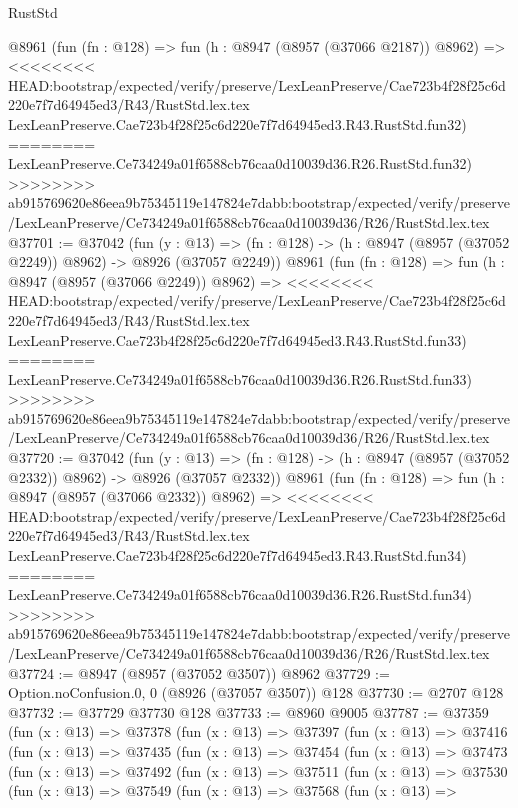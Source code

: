 \begin{lexlean}{RustStd}
\begin{coremodule}
{\begin{coremodule}
{{{{{{{{{{{{{{{{{{{{{{{{{{{{{{{{{{{{{{{    @8961
    (fun (fn : @128) =>
    fun (h : @8947 (@8957 (@37066 @2187)) @8962) =>
<<<<<<<< HEAD:bootstrap/expected/verify/preserve/LexLeanPreserve/Cae723b4f28f25c6d220e7f7d64945ed3/R43/RustStd.lex.tex
    LexLeanPreserve.Cae723b4f28f25c6d220e7f7d64945ed3.R43.RustStd.fun32)
========
    LexLeanPreserve.Ce734249a01f6588cb76caa0d10039d36.R26.RustStd.fun32)
>>>>>>>> ab915769620e86eea9b75345119e147824e7dabb:bootstrap/expected/verify/preserve/LexLeanPreserve/Ce734249a01f6588cb76caa0d10039d36/R26/RustStd.lex.tex
@37701 := @37042
    (fun (y : @13) =>
    (fn : @128) -> (h : @8947 (@8957 (@37052 @2249)) @8962) -> @8926 (@37057 @2249))
    @8961
    (fun (fn : @128) =>
    fun (h : @8947 (@8957 (@37066 @2249)) @8962) =>
<<<<<<<< HEAD:bootstrap/expected/verify/preserve/LexLeanPreserve/Cae723b4f28f25c6d220e7f7d64945ed3/R43/RustStd.lex.tex
    LexLeanPreserve.Cae723b4f28f25c6d220e7f7d64945ed3.R43.RustStd.fun33)
========
    LexLeanPreserve.Ce734249a01f6588cb76caa0d10039d36.R26.RustStd.fun33)
>>>>>>>> ab915769620e86eea9b75345119e147824e7dabb:bootstrap/expected/verify/preserve/LexLeanPreserve/Ce734249a01f6588cb76caa0d10039d36/R26/RustStd.lex.tex
@37720 := @37042
    (fun (y : @13) =>
    (fn : @128) -> (h : @8947 (@8957 (@37052 @2332)) @8962) -> @8926 (@37057 @2332))
    @8961
    (fun (fn : @128) =>
    fun (h : @8947 (@8957 (@37066 @2332)) @8962) =>
<<<<<<<< HEAD:bootstrap/expected/verify/preserve/LexLeanPreserve/Cae723b4f28f25c6d220e7f7d64945ed3/R43/RustStd.lex.tex
    LexLeanPreserve.Cae723b4f28f25c6d220e7f7d64945ed3.R43.RustStd.fun34)
========
    LexLeanPreserve.Ce734249a01f6588cb76caa0d10039d36.R26.RustStd.fun34)
>>>>>>>> ab915769620e86eea9b75345119e147824e7dabb:bootstrap/expected/verify/preserve/LexLeanPreserve/Ce734249a01f6588cb76caa0d10039d36/R26/RustStd.lex.tex
@37724 := @8947 (@8957 (@37052 @3507)) @8962
@37729 := Option.noConfusion.{0, 0} (@8926 (@37057 @3507)) @128
@37730 := @2707 @128
@37732 := @37729 @37730 @128
@37733 := @8960 @9005
@37787 := @37359
    (fun (x : @13) =>
    @37378
      (fun (x : @13) =>
      @37397
        (fun (x : @13) =>
        @37416
          (fun (x : @13) =>
          @37435
            (fun (x : @13) =>
            @37454
              (fun (x : @13) =>
              @37473
                (fun (x : @13) =>
                @37492
                  (fun (x : @13) =>
                  @37511
                    (fun (x : @13) =>
                    @37530
                      (fun (x : @13) =>
                      @37549
                        (fun (x : @13) =>
                        @37568
                          (fun (x : @13) =>
}}}}}}}}}}}}}}}}}}}}}}}}}}}}}}}}}}}}}}}
\end{coremodule}}
\end{coremodule}
\end{lexlean}
